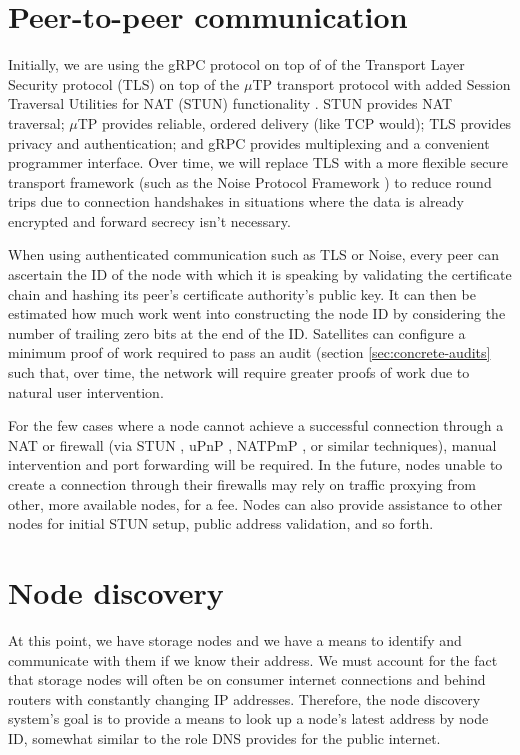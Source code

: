 \documentclass[8pt,fleqn,openany]{book}
\begin{document}
\section{Peer-to-peer communication}

Initially, we are using the gRPC \cite{grpc} protocol on top of of the
Transport Layer Security protocol (TLS) \cite{tls} on top of the $\mu$TP
\cite{utp} transport protocol with added Session Traversal Utilities for NAT
(STUN) functionality \cite{stun}.
STUN provides NAT traversal; $\mu$TP provides reliable,
ordered delivery (like TCP would); TLS provides privacy and authentication;
and gRPC provides multiplexing and a convenient programmer interface.
Over time, we will replace TLS with a more flexible secure transport
framework (such as the Noise Protocol Framework \cite{noise-proto}) to
reduce round trips due to connection handshakes in situations where the data is
already encrypted and forward secrecy isn't necessary.

When using authenticated communication such as TLS or Noise, every peer can
ascertain the ID of the node with which it is
speaking by validating the certificate chain and hashing its peer's
certificate authority's public key. It can then be estimated how much work went
into constructing the node ID by considering the number of trailing zero bits
at the end of the ID.
Satellites can configure a minimum proof of work required to pass an
audit (section \ref{sec:concrete-audits}
such that, over time, the network will require greater proofs of work
due to natural user intervention.

For the few cases where a node cannot achieve a successful connection through a
NAT or firewall (via STUN \cite{stun}, uPnP \cite{upnp}, NATPmP \cite{natpmp},
or similar techniques), manual
intervention and port forwarding will be required. In the future, nodes unable
to create a connection through their firewalls may rely on traffic proxying from
other, more available nodes, for a fee. Nodes can also provide
assistance to other nodes for initial STUN setup, public address validation,
and so forth.

\section{Node discovery}\label{sec:concrete-node-discovery}

At this point, we have storage nodes and we have a means to identify and
communicate with
them if we know their address. We must account for the fact that storage nodes
will often be on consumer internet connections and behind routers with
constantly changing IP
addresses. Therefore, the node discovery system's goal is to provide a means to look
up a node's latest address by node ID, somewhat similar to the role DNS
provides for the public internet.
\end{document}

